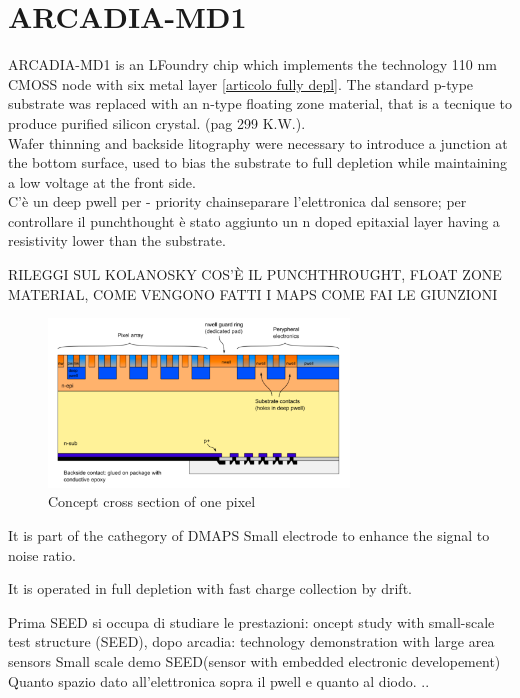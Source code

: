 \section{ARCADIA-MD1}

ARCADIA-MD1 is an LFoundry chip which implements the technology 110 nm CMOSS node
with six metal layer \ref{articolo fully depl}.
The standard p-type substrate was replaced with an n-type floating zone material,
that is a tecnique to produce purified silicon crystal. (pag 299 K.W.).\\

Wafer thinning and backside litography were necessary to introduce a junction
at the bottom surface, used to bias the substrate to full depletion while
maintaining a low voltage at the front side.  \\
C'è un deep pwell per - priority chainseparare l'elettronica dal sensore; per controllare il punchthought
è stato aggiunto un n doped epitaxial layer having a resistivity lower than the substrate.

RILEGGI SUL KOLANOSKY COS'È IL PUNCHTHROUGHT, FLOAT ZONE MATERIAL, COME VENGONO FATTI I MAPS
COME FAI LE GIUNZIONI

\begin{figure}
\centering\includegraphics[width=8cm]{figures/pixel_scheme.png}
\caption{Concept cross section of one pixel}
\label{fig:pixel_scheme}
\end{figure}

It is part of the cathegory of DMAPS
Small electrode to enhance the signal to noise ratio.

It is operated in full depletion with fast charge collection by drift.

Prima SEED si occupa di studiare le prestazioni: oncept study with small-scale test structure (SEED),
dopo arcadia: technology demonstration with large area sensors
Small scale demo SEED(sensor with embedded electronic developement)
Quanto spazio dato all'elettronica sopra il pwell e quanto al diodo. ..




